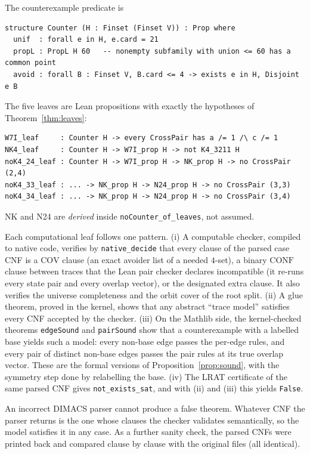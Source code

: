 \documentclass[11pt]{amsart}
\theoremstyle{definition}
\newcommand{\Cov}{\mathrm{COV}}
\newcommand{\Conf}{\mathrm{CONF}}
\begin{document}
The counterexample predicate is
{\footnotesize\begin{verbatim}
structure Counter (H : Finset (Finset V)) : Prop where
  unif  : forall e in H, e.card = 21
  propL : PropL H 60   -- nonempty subfamily with union <= 60 has a common point
  avoid : forall B : Finset V, B.card <= 4 -> exists e in H, Disjoint e B
\end{verbatim}}
The five leaves are Lean propositions with exactly the hypotheses of Theorem~\ref{thm:leaves}:
{\footnotesize\begin{verbatim}
W7I_leaf     : Counter H -> every CrossPair has a /= 1 /\ c /= 1
NK4_leaf     : Counter H -> W7I_prop H -> not K4_3211 H
noK4_24_leaf : Counter H -> W7I_prop H -> NK_prop H -> no CrossPair (2,4)
noK4_33_leaf : ... -> NK_prop H -> N24_prop H -> no CrossPair (3,3)
noK4_34_leaf : ... -> NK_prop H -> N24_prop H -> no CrossPair (3,4)
\end{verbatim}}
NK and N24 are \emph{derived} inside \texttt{noCounter\_of\_leaves}, not assumed.

Each computational leaf follows one pattern. (i) A computable checker, compiled to native code, verifies by \texttt{native\_decide} that every clause of the parsed case CNF is a $\Cov$ clause (an exact avoider list of a needed $4$-set), a binary $\Conf$ clause between traces that the Lean pair checker declares incompatible (it re-runs every state pair and every overlap vector), or the designated extra clause. It also verifies the universe completeness and the orbit cover of the root split. (ii) A glue theorem, proved in the kernel, shows that any abstract ``trace model'' satisfies every CNF accepted by the checker. (iii) On the Mathlib side, the kernel-checked theorems \texttt{edgeSound} and \texttt{pairSound} show that a counterexample with a labelled base yields such a model: every non-base edge passes the per-edge rules, and every pair of distinct non-base edges passes the pair rules at its true overlap vector. These are the formal versions of Proposition~\ref{prop:sound}, with the symmetry step done by relabelling the base. (iv) The LRAT certificate of the same parsed CNF gives \texttt{not\_exists\_sat}, and with (ii) and (iii) this yields \texttt{False}.

An incorrect DIMACS parser cannot produce a false theorem. Whatever CNF the parser returns is the one whose clauses the checker validates semantically, so the model satisfies it in any case. As a further sanity check, the parsed CNFs were printed back and compared clause by clause with the original files (all identical).
\end{document}
